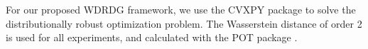 \documentclass[journal]{IEEEtran}
\begin{document}
For our proposed WDRDG framework, 
we use the CVXPY package \cite{diamond2016cvxpy} to solve the distributionally robust optimization problem.
The Wasserstein distance of order 2 is used for all experiments, and calculated with the POT package \cite{flamary2021pot}. 
\end{document}

